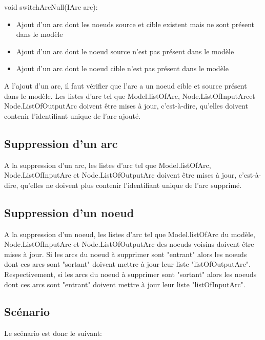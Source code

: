 \documentclass{article}
\begin{document}
void switchArcNull(IArc arc):

\begin{itemize}
\item Ajout d'un arc dont les noeuds source et cible existent mais ne sont 
pr\'esent dans le mod\`ele

\item Ajout d'un arc dont le noeud source n'est pas pr\'esent dans le 
mod\`ele

\item Ajout d'un arc dont le noeud cible n'est pas pr\'esent dans le 
mod\`ele
\end{itemize}

A l'ajout d'un arc, il faut v\'erifier que l'arc a un noeud cible et source 
pr\'esent dans le mod\`ele.
Les listes d'arc tel que Model.listOfArc, Node.ListOfInputArcet 
Node.ListOfOutputArc
doivent \^etre mises \`a jour, c'est-\`a-dire, qu'elles doivent contenir 
l'identifiant unique de l'arc ajout\'e.

\subsection{Suppression d'un arc}

A la suppression d'un arc, les listes d'arc tel que Model.listOfArc,
Node.ListOfInputArc et Node.ListOfOutputArc doivent \^etre mises \`a jour,
c'est-\`a-dire, qu'elles ne doivent plus contenir l'identifiant unique de 
l'arc supprim\'e.

\subsection{Suppression d'un noeud}

A la suppression d'un noeud, les listes d'arc tel que Model.listOfArc du 
mod\`ele, Node.ListOfInputArc et Node.ListOfOutputArc des noeuds voisins
doivent \^etre mises \`a jour.
Si les arcs du noeud \`a supprimer sont "entrant" alors les noeuds dont ces 
arcs sont "sortant" doivent mettre \`a jour leur liste "listOfOutputArc".
Respectivement, si les arcs du noeud \`a supprimer sont "sortant"
alors les noeuds dont ces arcs sont "entrant" doivent mettre \`a jour leur 
liste "listOfInputArc".


\subsection{Sc\'enario}

Le sc\'enario est donc le suivant:
\\
\end{document}
